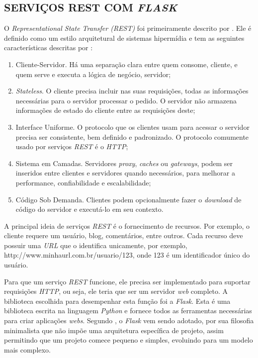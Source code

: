 \subsection{SERVIÇOS REST COM \emph{FLASK}}
\label{servicos_rest}

O \emph{Representational State Transfer (REST)} foi primeiramente descrito por . 
Ele é definido como um estilo arquitetural de sistemas hipermídia e tem as seguintes características descritas por :

\begin{enumerate}
	\item Cliente-Servidor. Há uma separação clara entre quem consome, cliente, e quem serve e executa a lógica de negócio, servidor;
	\item \emph{Stateless}. O cliente precisa incluir nas suas requisições, todas as informações necessárias para o servidor processar o pedido. O servidor não armazena informações de estado do cliente entre as requisições deste;
	\item Interface Uniforme. O protocolo que os clientes usam para acessar o servidor precisa ser consistente, bem definido e padronizado. O protocolo comumente usado por serviços \emph{REST} é o \emph{HTTP};
	\item Sistema em Camadas. Servidores \emph{proxy}, \emph{caches} ou \emph{gateways}, podem ser inseridos entre clientes e servidores quando necessários, para melhorar a performance, confiabilidade e escalabilidade;
	\item Código Sob Demanda. Clientes podem opcionalmente fazer o \emph{download} de código do servidor e executá-lo em seu contexto.
\end{enumerate}

A principal ideia de serviços \emph{REST} é o fornecimento de recursos. 
Por exemplo, o cliente requere um usuário, blog, comentários, entre outros. 
Cada recurso deve possuir uma \emph{URL} que o identifica unicamente, por exemplo, http://www.minhaurl.com.br/usuario/123, onde 123 é um identificador único do usuário.

Para que um serviço \emph{REST} funcione, ele precisa ser implementado para suportar requisições \emph{HTTP}, ou seja, ele teria que ser um servidor \emph{web} completo. 
A biblioteca escolhida para desempenhar esta função foi a \emph{Flask}. 
Esta é uma biblioteca escrita na linguagem \emph{Python} e fornece todos as ferramentas necessárias para criar aplicações \emph{webs}. 
Segundo , o \emph{Flask} vem sendo adotado, por sua filosofia minimalista que não impõe uma arquitetura específica de projeto, assim permitindo que um projeto comece pequeno e simples, evoluindo para um modelo mais complexo.


